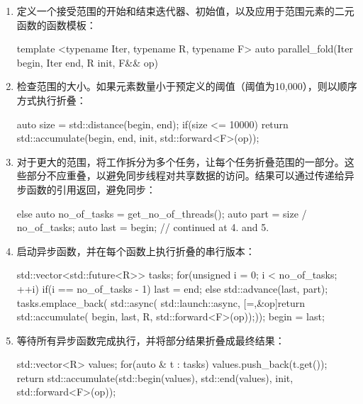 \begin{enumerate}
\item
定义一个接受范围的开始和结束迭代器、初始值，以及应用于范围元素的二元函数的函数模板：

\begin{cpp}
template <typename Iter, typename R, typename F>
auto parallel_fold(Iter begin, Iter end, R init, F&& op)
{
}
\end{cpp}

\item
检查范围的大小。如果元素数量小于预定义的阈值（阈值为10,000），则以顺序方式执行折叠：

\begin{cpp}
auto size = std::distance(begin, end);
if(size <= 10000)
    return std::accumulate(begin, end, init, std::forward<F>(op));
\end{cpp}

\item
对于更大的范围，将工作拆分为多个任务，让每个任务折叠范围的一部分。这些部分不应重叠，以避免同步线程对共享数据的访问。结果可以通过传递给异步函数的引用返回，避免同步：

\begin{cpp}
else
{
    auto no_of_tasks = get_no_of_threads();
    auto part = size / no_of_tasks;
    auto last = begin;
    // continued at 4. and 5.
}
\end{cpp}

\item
启动异步函数，并在每个函数上执行折叠的串行版本：

\begin{cpp}
std::vector<std::future<R>> tasks;
for(unsigned i = 0; i < no_of_tasks; ++i)
{
    if(i == no_of_tasks - 1) last = end;
    else std::advance(last, part);
    tasks.emplace_back(
    std::async(
        std::launch::async,
        [=,&op]{return std::accumulate(
                            begin, last, R{},
                            std::forward<F>(op));}));
    begin = last;
}
\end{cpp}

\item
等待所有异步函数完成执行，并将部分结果折叠成最终结果：

\begin{cpp}
std::vector<R> values;
for(auto & t : tasks)
    values.push_back(t.get());
return std::accumulate(std::begin(values), std::end(values),
                       init, std::forward<F>(op));
\end{cpp}
\end{enumerate}

